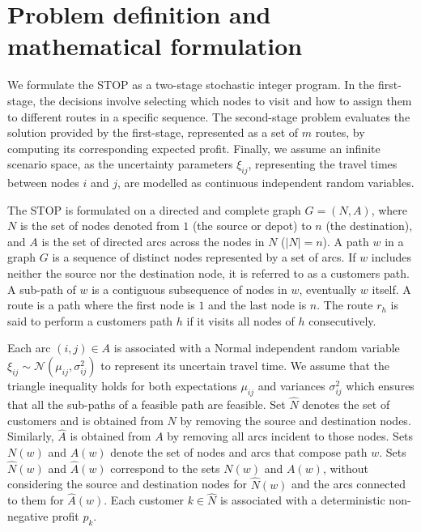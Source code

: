 \documentclass[11pt]{article}
\theoremstyle{definition}
\begin{document}
\section{Problem definition and mathematical formulation}
\label{sec:problem}

We formulate the STOP as a two-stage stochastic integer program. In the first-stage, the decisions involve selecting which nodes to visit and how to assign them to different routes in a specific sequence. The second-stage problem evaluates the solution provided by the first-stage, represented as a set of $m$ routes, by computing its corresponding expected profit.
Finally, we assume an infinite scenario space, as the uncertainty parameters $\xi_{ij}$, representing the travel times between nodes $i$ and $j$, are modelled as continuous independent random variables.


The STOP is formulated on a directed and complete graph $G=(N,A)$, where $N$ is the set of nodes denoted from $1$ (the source or depot) to $n$ (the destination), and $A$ is the set of directed arcs across the nodes in $N$ ($|N|=n$). A path $w$ in a graph $G$ is a sequence of distinct nodes represented by a set of arcs. If $w$ includes neither the source nor the destination node, it is referred to as a customers path. A sub-path of $w$ is a contiguous subsequence of nodes in $w$, eventually $w$ itself. A route is a path where the first node is $1$ and the last node is $n$. The route $r_h$ is said to perform a customers path $h$ if it visits all nodes of $h$ consecutively.

Each arc $(i,j) \in A$ is associated with a Normal independent random variable $\xi_{ij} \sim \mathcal{N}(\mu_{ij}, \sigma_{ij}^2)$ to represent its uncertain travel time. We assume that the triangle inequality holds for both expectations $\mu_{ij}$ and variances $\sigma_{ij}^2$ which ensures that all the sub-paths of a feasible path are feasible.
%
Set $\hat{N}$ denotes the set of customers and is obtained from $N$ by removing the source and destination nodes. Similarly, $\hat{A}$ is obtained from $A$ by removing all arcs incident to those nodes. Sets $N(w)$ and $A(w)$ denote the set of nodes and arcs that compose path $w$. Sets $\hat{N}(w)$ and $\hat{A}(w)$ correspond to the sets $N(w)$ and $A(w)$, without considering the source and destination nodes for $\hat{N}(w)$ and the arcs connected to them for $\hat{A}(w)$. Each customer $k \in \hat{N}$ is associated with a deterministic non-negative profit $p_k$.
\end{document}
